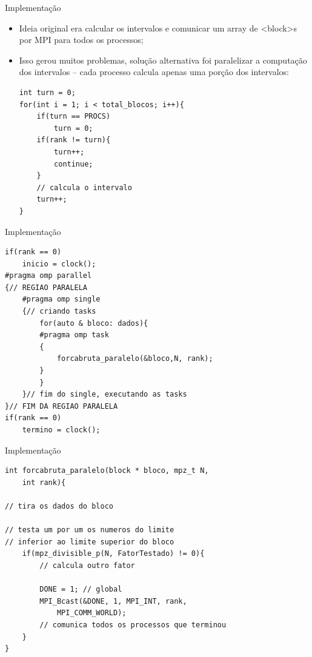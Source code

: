 \documentclass[xcolor=table]{beamer}
\def\texttt#1{<#1>}%
\begin{document}
    \begin{frame}[fragile]{Implementação}
        \begin{itemize}
            \item Ideia original era calcular os intervalos e comunicar um array de \texttt{block}s por MPI para todos os processos;
            \item Isso gerou muitos problemas, solução alternativa foi paralelizar a computação dos intervalos --
                cada processo calcula apenas uma porção dos intervalos:

        \begin{lstlisting}
int turn = 0;
for(int i = 1; i < total_blocos; i++){
    if(turn == PROCS)
        turn = 0;
    if(rank != turn){
        turn++;
        continue;
    }
    // calcula o intervalo
    turn++;
}
        \end{lstlisting}
        \end{itemize}
    \end{frame}

    \begin{frame}[fragile]{Implementação}
        \begin{lstlisting}
if(rank == 0)
    inicio = clock();
#pragma omp parallel
{// REGIAO PARALELA
    #pragma omp single
    {// criando tasks
        for(auto & bloco: dados){
        #pragma omp task
        {
            forcabruta_paralelo(&bloco,N, rank);
        }
        }
    }// fim do single, executando as tasks
}// FIM DA REGIAO PARALELA
if(rank == 0)
    termino = clock();
        \end{lstlisting}
    \end{frame}

    \begin{frame}[fragile]{Implementação}
        \begin{adjustwidth}{-1cm}{}
            \begin{lstlisting}
int forcabruta_paralelo(block * bloco, mpz_t N, 
    int rank){

// tira os dados do bloco

// testa um por um os numeros do limite 
// inferior ao limite superior do bloco
    if(mpz_divisible_p(N, FatorTestado) != 0){
        // calcula outro fator

        DONE = 1; // global
        MPI_Bcast(&DONE, 1, MPI_INT, rank, 
            MPI_COMM_WORLD);
        // comunica todos os processos que terminou
    }
}
            \end{lstlisting}
        \end{adjustwidth}
    \end{frame}
\end{document}
